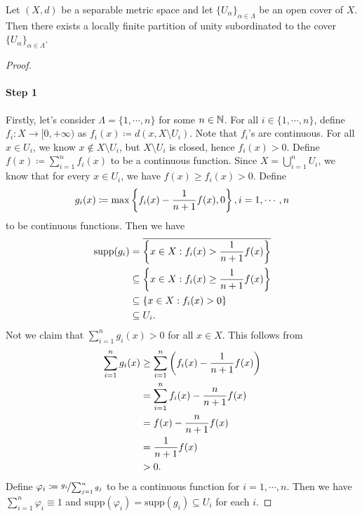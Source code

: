 \documentclass[screen,single]{techreport}
\numberwithin{equation}{section}
\begin{document}
\begin{theorem}\label{The:SeparMetricImplyLocFinPartiOfUnitySubord}
  Let $(X,d)$ be a separable metric space and let $\{U_\alpha\}_{\alpha \in \Lambda}$ be an open cover of $X$.
  Then there exists a locally finite partition of unity subordinated to the cover $\{U_\alpha\}_{\alpha \in \Lambda}$.
\end{theorem}
\begin{proof}\
  \paragraph{Step 1}
  Firstly, let's consider $\Lambda=\{1,\cdots,n\}$ for some $n \in \mathbb{N}$.
  For all $i \in \{1,\cdots,n\}$, define $f_i : X \to [0,+\infty)$ as $f_i(x) \coloneqq d(x, X \setminus U_i)$.
  Note that $f_i$'s are continuous.
  For all $x \in U_i$, we know $x \not\in X \setminus U_i$, but $X \setminus U_i$ is closed, hence $f_i(x) > 0$.
  Define $f(x) \coloneqq \sum_{i=1}^n f_i(x)$ to be a continuous function.
  Since $X = \bigcup_{i=1}^n U_i$, we know that for every $x \in U_i$, we have $f(x) \ge f_i(x) > 0$.
  Define
  \[
  g_i(x) \coloneqq \max\left\{ { f_i(x) - \frac{1}{n+1} f(x), 0} \right\}, i=1,\cdots,n
  \]
  to be continuous functions.
  Then we have
  \begin{align*}
    \mathrm{supp}(g_i) & = \overline{\left\{ {x \in X : f_i(x) > \frac{1}{n+1} f(x) } \right\}} \\
    & \subseteq \left\{ {x \in X: f_i(x) \ge \frac{1}{n+1} f(x) } \right\} \\
    & \subseteq \left\{ {x \in X: f_i(x) > 0 } \right\} \\
    & \subseteq U_i.
  \end{align*}
  Not we claim that $\sum_{i=1}^n g_i(x) > 0$ for all $x \in X$.
  This follows from
  \begin{align*}
    \sum_{i=1}^n g_i(x) & \ge \sum_{i=1}^n \left({ f_i(x) - \frac{1}{n+1} f(x) }\right) \\ 
    & = \sum_{i=1}^n f_i(x) - \frac{n}{n+1} f(x) \\
    & = f(x) - \frac{n}{n+1} f(x) \\
    & = \frac{1}{n+1} f(x) \\
    & > 0.
  \end{align*}
  Define $\varphi_i \coloneqq \nicefrac{g_i}{\sum_{j=1}^n g_j}$ to be a continuous function for $i=1,\cdots,n$.
  Then we have $\sum_{i=1}^n \varphi_i \equiv 1$ and $\mathrm{supp}(\varphi_i) = \mathrm{supp}(g_i) \subseteq U_i$ for each $i$.
  

\end{proof}
\end{document}
